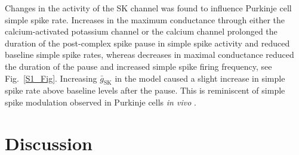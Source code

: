 \documentclass[utf8]{frontiersSCNS} %
\newcommand{\msi}{\,\mathrm{mS cm^{-2}}}
\newcommand{\sk}{\mathrm{SK}}
\begin{document}

Changes in the activity of the SK channel was found to influence Purkinje cell simple spike rate. Increases in the maximum conductance through either the calcium-activated potassium
channel or the calcium channel prolonged the duration of the
post-complex spike pause in simple spike activity and reduced baseline
simple spike rates, whereas decreases in maximal conductance reduced
the duration of the pause and increased simple spike firing frequency,
see Fig.~\ref{S1_Fig}. Increasing $\bar{g}_\sk$ in the model caused a
slight increase in simple spike rate above baseline levels after the
pause. This is reminiscent of simple spike modulation observed in
Purkinje cells \textsl{in vivo} \cite{BurroughsEtAl2016}.




\section{Discussion}
\end{document}
